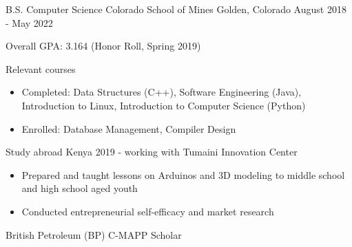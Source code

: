 \vspace{-2.0mm}


\begin{cventries}

  \cventry
    {B.S. Computer Science}
    {Colorado School of Mines} %
    {Golden, Colorado} %
    {August 2018 - May 2022} %
    {
      \begin{cvitems} %
        \item {Overall GPA: 3.164 (Honor Roll, Spring 2019)}
        \item {Relevant courses}
        \begin {itemize}
               \item {Completed: Data Structures (C++), Software
    Engineering (Java), Introduction to Linux, Introduction to
    Computer Science (Python)}
        \item {Enrolled: Database Management, Compiler Design}
       \end {itemize}
\item {Study abroad Kenya 2019 - working with Tumaini Innovation Center}
  \begin{itemize}
    \item {Prepared and taught lessons on Arduinos and 3D modeling to
    middle school and high school aged youth}
    \item {Conducted entrepreneurial self-efficacy and market research}
\end{itemize}
\item {British Petroleum (BP) C-MAPP Scholar}
      \end{cvitems}
    }



\end{cventries}


